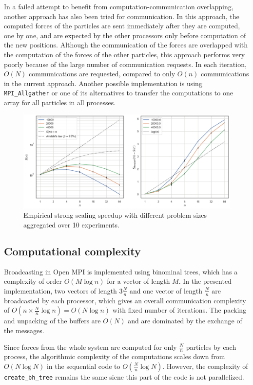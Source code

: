 \documentclass[10pt,journal,compsocconf]{IEEEtran}
\newcommand{\code}[1]{{\small \texttt{#1}}}
\begin{document}
In a failed attempt to benefit from computation-communication overlapping, another approach has also been tried for communication. In this approach, the computed forces of the particles are sent immediately after they are computed, one by one, and are expected by the other processors only before computation of the new positions. Although the communication of the forces are overlapped with the computation of the forces of the other particles, this approach performs very poorly because of the large number of communication requests. In each iteration, $O(N)$ communications are requested, compared to only $O(n)$ communications in the current approach. Another possible implementation is using \code{MPI\_Allgather} or one of its alternatives to transfer the computations to one array for all particles in all processes.

\begin{figure}[ht]
  \centering
  \includegraphics[width=.75\textwidth]{img/strongscaling.png}
  \caption{Empirical strong scaling speedup with different problem sizes aggregated over 10 experiments.}
  \label{fig:strongscaling}
\end{figure}

\subsection{Computational complexity}

Broadcasting in Open MPI is implemented using binominal trees, which has a complexity of order $O(M \log n)$ for a vector of length $M$. In the presented implementation, two vectors of length $3 \frac{N}{n}$ and one vector of length $\frac{N}{n}$ are broadcasted by each processor, which gives an overall communication complexity of $O(n \times \frac{N}{n} \log n) = O(N \log n)$ with fixed number of iterations. The packing and unpacking of the buffers are $O(N)$ and are dominated by the exchange of the messages.

Since forces from the whole system are computed for only $\frac{N}{n}$ particles by each process, the algorithmic complexity of the computations scales down from $O(N \log N)$ in the sequential code to $O(\frac{N}{n} \log N)$. However, the complexity of \code{create\_bh\_tree} remains the same sicne this part of the code is not parallelized.
\end{document}
